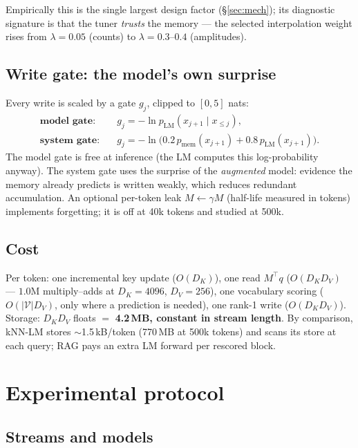 \documentclass[11pt]{article}
\begin{document}
Empirically this is the single largest design factor (\S\ref{sec:mech}); its diagnostic signature is that the tuner \emph{trusts} the memory --- the selected interpolation weight rises from $\lambda = 0.05$ (counts) to $\lambda = 0.3$--$0.4$ (amplitudes).

\subsection{Write gate: the model's own surprise}\label{sec:gate}

Every write is scaled by a gate $g_j$, clipped to $[0, 5]$ nats:
\begin{align}
\textbf{model gate:}\quad & g_j = -\ln p_{\mathrm{LM}}(x_{j+1}\mid x_{\le j}), \\
\textbf{system gate:}\quad & g_j = -\ln\bigl(0.2\, p_{\mathrm{mem}}(x_{j+1}) + 0.8\, p_{\mathrm{LM}}(x_{j+1})\bigr).
\end{align}
The model gate is free at inference (the LM computes this log-probability anyway). The system gate uses the surprise of the \emph{augmented} model: evidence the memory already predicts is written weakly, which reduces redundant accumulation. An optional per-token leak $M \leftarrow \gamma M$ (half-life measured in tokens) implements forgetting; it is off at 40k tokens and studied at 500k.

\subsection{Cost}

Per token: one incremental key update ($O(D_K)$), one read $M^\top q$ ($O(D_K D_V)$ --- $1.0$M multiply--adds at $D_K{=}4096$, $D_V{=}256$), one vocabulary scoring ($O(|\mathcal V| D_V)$, only where a prediction is needed), one rank-1 write ($O(D_K D_V)$). Storage: $D_K D_V$ floats $=$ \textbf{4.2\,MB, constant in stream length}. By comparison, kNN-LM stores $\sim$1.5\,kB/token (770\,MB at 500k tokens) and scans its store at each query; RAG pays an extra LM forward per rescored block.

\section{Experimental protocol}\label{sec:protocol}

\subsection{Streams and models}
\end{document}

